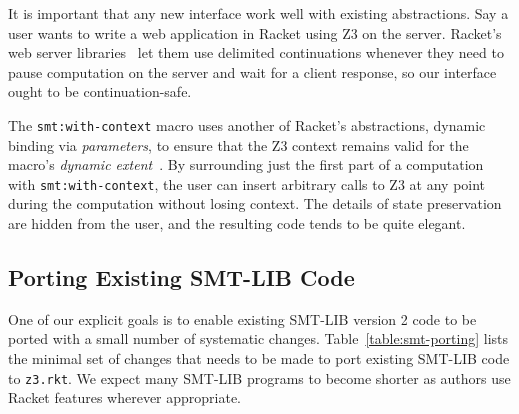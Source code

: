 It is important that any new interface work well with existing abstractions.
Say a user wants to write a web application in Racket using Z3 on the server.
Racket's web server libraries~\cite{racket/web-server} let them use delimited
continuations whenever they need to pause computation on the server and wait
for a client response, so our interface ought to be continuation-safe.

The \texttt{smt:with-context} macro  uses another of Racket's
abstractions,  dynamic  binding  via \textit{parameters},  to
ensure  that the  Z3 context  remains valid  for  the macro's
\textit{dynamic      extent}~\cite{delimitedcontrol}.
 By  surrounding just  the first  part  of a
computation  with  \texttt{smt:with-context},  the  user  can
insert  arbitrary  calls  to  Z3  at  any  point  during  the
computation  without  losing context.  The  details of  state
preservation are hidden from  the user, and 
the resulting code tends to be quite elegant.

\subsection{Porting Existing SMT-LIB Code}
\label{sec:porting-smt-lib}

One of our explicit goals is to enable existing SMT-LIB version 2 code to be
ported with a small number of systematic changes. Table~\ref{table:smt-porting}
lists the minimal set of changes that needs to be made to port
existing SMT-LIB code to \texttt{z3.rkt}. We expect many SMT-LIB programs
to become shorter as authors use Racket features wherever appropriate.

